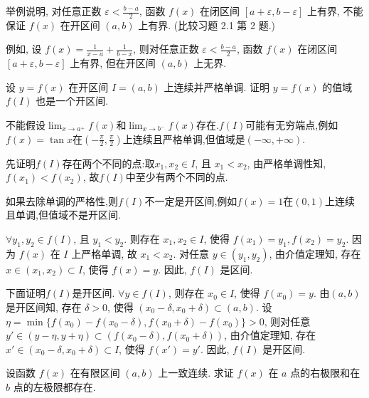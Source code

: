 \begin{exercise}[2.2.11]
    举例说明, 对任意正数 $\varepsilon < \frac{b-a}{2}$, 函数 $f(x)$ 在闭区间 $[a+\varepsilon, b-\varepsilon]$ 上有界, 不能保证 $f(x)$ 在开区间 $(a,b)$ 上有界. (比较习题 2.1 第 2 题.)
\end{exercise}

\begin{solution}
    例如, 设 $f(x) = \frac{1}{x-a} + \frac{1}{b-x}$, 则对任意正数 $\varepsilon < \frac{b-a}{2}$, 函数 $f(x)$ 在闭区间 $[a+\varepsilon, b-\varepsilon]$ 上有界, 但在开区间 $(a,b)$ 上无界.
\end{solution}

\begin{exercise}[2.2.12]
    设 $y=f(x)$ 在开区间 $I=(a,b)$ 上连续并严格单调. 证明 $y=f(x)$ 的值域 $f(I)$ 也是一个开区间.
\end{exercise}

\begin{solution}
    \begin{remark}
        不能假设$\lim_{x \to a^+} f(x)$和$\lim_{x \to b^-} f(x)$存在.$f(I)$可能有无穷端点,例如$f(x)=\tan x$在$(-\frac{\pi}{2}, \frac{\pi}{2})$上连续且严格单调,但值域是$(-\infty,+\infty)$.
    \end{remark}

    先证明$f(I)$存在两个不同的点:取$x_1, x_2 \in I$, 且 $x_1 < x_2$, 由严格单调性知, $f(x_1) < f(x_2)$, 故$f(I)$中至少有两个不同的点.\begin{remark}
        如果去除单调的严格性,则$f(I)$不一定是开区间,例如$f(x)=1$在$(0,1)$上连续且单调,但值域不是开区间.
    \end{remark}

    $\forall y_1, y_2 \in f(I)$, 且 $y_1 < y_2$. 则存在 $x_1, x_2 \in I$, 使得 $f(x_1) = y_1, f(x_2) = y_2$. 因为 $f(x)$ 在 $I$ 上严格单调, 故 $x_1 < x_2$. 对任意 $y \in (y_1, y_2)$, 由介值定理知, 存在 $x \in (x_1, x_2) \subset I$, 使得 $f(x) = y$. 因此, $f(I)$ 是区间.

    下面证明$f(I)$是开区间. $\forall y \in f(I)$, 则存在 $x_0 \in I$, 使得 $f(x_0) = y$. 由$(a,b)$是开区间知, 存在 $\delta > 0$, 使得 $(x_0 - \delta, x_0 + \delta) \subset (a,b)$. 设 $\eta = \min\{f(x_0) - f(x_0 - \delta), f(x_0 + \delta) - f(x_0)\} > 0$, 则对任意 $y' \in (y - \eta, y + \eta)\subset (f(x_0 - \delta), f(x_0 + \delta))$, 由介值定理知, 存在 $x' \in (x_0 - \delta, x_0 + \delta) \subset I$, 使得 $f(x') = y'$. 因此, $f(I)$ 是开区间.
\end{solution}

\begin{exercise}[2.2.13]
    设函数 $f(x)$ 在有限区间 $(a,b)$ 上一致连续. 求证 $f(x)$ 在 $a$ 点的右极限和在 $b$ 点的左极限都存在.
\end{exercise}

